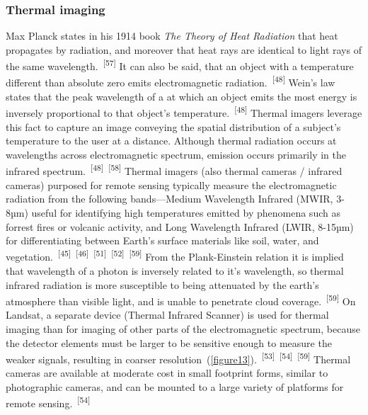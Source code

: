 \documentclass{article}
\begin{document}
\subsubsection{Thermal imaging}


\par{Max Planck states in his 1914 book \textit{The Theory of Heat Radiation} that heat propagates by radiation, and moreover that heat rays are identical to light rays of the same wavelength.~\textsuperscript{[57]} It can also be said, that an object with a temperature different than absolute zero emits electromagnetic radiation.~\textsuperscript{[48]} Wein's law states that the peak wavelength of a at which an object emits the most energy is inversely proportional to that object's temperature.~\textsuperscript{[48]} Thermal imagers leverage this fact to capture an image conveying the spatial distribution of a subject's temperature to the user at a distance. Although thermal radiation occurs at wavelengths across electromagnetic spectrum, emission occurs primarily in the infrared spectrum.~\textsuperscript{[48]}~\textsuperscript{[58]} Thermal imagers (also thermal cameras / infrared cameras) purposed for remote sensing typically measure the electromagnetic radiation from the following bands---Medium Wavelength Infrared (MWIR, 3-8µm) useful for identifying high temperatures emitted by phenomena such as forrest fires or volcanic activity, and Long Wavelength Infrared (LWIR, 8-15µm) for differentiating between Earth's surface materials like soil, water, and vegetation.~\textsuperscript{[45]}~\textsuperscript{[46]}~\textsuperscript{[51]}~\textsuperscript{[52]}~\textsuperscript{[59]} From the Plank-Einstein relation it is implied that wavelength of a photon is inversely related to it's wavelength, so thermal infrared radiation is more susceptible to being attenuated by the earth's atmosphere than visible light, and is unable to penetrate cloud coverage.~\textsuperscript{[59]} On Landsat, a separate device (Thermal Infrared Scanner) is used for thermal imaging than for imaging of other parts of the electromagnetic spectrum, because the detector elements must be larger to be sensitive enough to measure the weaker signals, resulting in coarser resolution~(\cref{figure13}).~\textsuperscript{[53]}~\textsuperscript{[54]}~\textsuperscript{[59]} Thermal cameras are available at moderate cost in small footprint forms, similar to photographic cameras, and can be mounted to a large variety of platforms for remote sensing.~\textsuperscript{[54]}}
\end{document}
